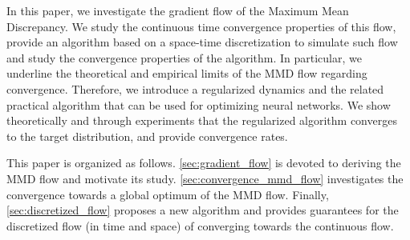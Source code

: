 In this paper, we investigate the gradient flow of the Maximum Mean Discrepancy. We study the continuous time convergence properties of this flow, provide an algorithm based on a space-time discretization to simulate such flow and study the convergence properties of the algorithm. In particular, we underline the theoretical and empirical limits of the MMD flow regarding convergence. Therefore, we introduce a regularized dynamics and the related practical algorithm that can be used for optimizing neural networks. We show theoretically and through experiments that the regularized algorithm converges to the target distribution, and provide convergence rates.

This paper is organized as follows.  \cref{sec:gradient_flow} is devoted to deriving the MMD flow and motivate its study.
\cref{sec:convergence_mmd_flow} investigates the convergence towards a global optimum of the MMD flow. Finally, \cref{sec:discretized_flow} proposes a new algorithm and provides guarantees for the discretized flow (in time and space) of converging towards the continuous flow. 